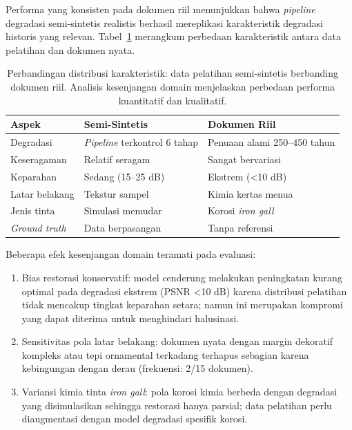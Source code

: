 \documentclass[12pt,a4paper]{article}
\begin{document}
Performa yang konsisten pada dokumen riil menunjukkan bahwa \textit{pipeline} degradasi semi-sintetis realistis berhasil mereplikasi karakteristik degradasi historis yang relevan. Tabel~\ref{table:synthetic_vs_real_comparison} merangkum perbedaan karakteristik antara data pelatihan dan dokumen nyata.

\begin{table}[!t]
    \renewcommand{\arraystretch}{1.15}
    \caption[Kesenjangan domain pelatihan-riil]{Perbandingan distribusi karakteristik: data pelatihan semi-sintetis berbanding dokumen riil. Analisis kesenjangan domain menjelaskan perbedaan performa kuantitatif dan kualitatif.}
    \label{table:synthetic_vs_real_comparison}
    \begin{tabularx}{\textwidth}{|>{\raggedright\arraybackslash}l|>{\raggedright\arraybackslash}X|>{\raggedright\arraybackslash}X|}
        \hline
        \textbf{Aspek} & \textbf{Semi-Sintetis} & \textbf{Dokumen Riil} \\
        \hline
        Degradasi             & \textit{Pipeline} terkontrol 6 tahap & Penuaan alami 250--450 tahun \\
        \hline
        Keseragaman           & Relatif seragam              & Sangat bervariasi         \\
        \hline
        Keparahan             & Sedang (15--25 dB)           & Ekstrem (<10 dB)          \\
        \hline
        Latar belakang        & Tekstur sampel               & Kimia kertas menua        \\
        \hline
        Jenis tinta           & Simulasi memudar             & Korosi \textit{iron gall} \\
        \hline
        \textit{Ground truth} & Data berpasangan             & Tanpa referensi           \\
        \hline
    \end{tabularx}
\end{table}

Beberapa efek kesenjangan domain teramati pada evaluasi:
\begin{enumerate}[leftmargin=1.5em, labelsep=0.5em, itemindent=0pt, noitemsep, topsep=0pt]
    \item Bias restorasi konservatif: model cenderung melakukan peningkatan kurang optimal pada degradasi ekstrem (PSNR <10 dB) karena distribusi pelatihan tidak mencakup tingkat keparahan setara; namun ini merupakan kompromi yang dapat diterima untuk menghindari halusinasi.

    \item Sensitivitas pola latar belakang: dokumen nyata dengan margin dekoratif kompleks atau tepi ornamental terkadang terhapus sebagian karena kebingungan dengan derau (frekuensi: 2/15 dokumen).

    \item Variansi kimia tinta \textit{iron gall}: pola korosi kimia berbeda dengan degradasi yang disimulasikan sehingga restorasi hanya parsial; data pelatihan perlu diaugmentasi dengan model degradasi spesifik korosi.
\end{enumerate}
\end{document}
